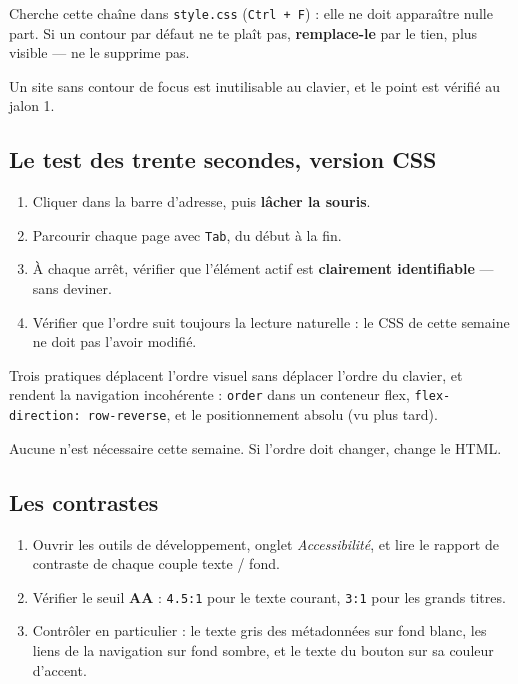 \documentclass[a4paper,11pt]{article}
\begin{document}
\begin{tcolorbox}[interdit, title={Aucun \texttt{outline: none} dans le fichier}]
Cherche cette chaîne dans \texttt{style.css} (\texttt{Ctrl + F}) : elle ne doit apparaître nulle part. Si un contour par défaut ne te plaît pas, \textbf{remplace-le} par le tien, plus visible --- ne le supprime pas.

\vspace{3pt}
Un site sans contour de focus est inutilisable au clavier, et le point est vérifié au jalon 1.
\end{tcolorbox}

\subsection{Le test des trente secondes, version CSS}

\begin{enumerate}
  \item Cliquer dans la barre d'adresse, puis \textbf{lâcher la souris}.
  \item Parcourir chaque page avec \texttt{Tab}, du début à la fin.
  \item À chaque arrêt, vérifier que l'élément actif est \textbf{clairement identifiable} --- sans deviner.
  \item Vérifier que l'ordre suit toujours la lecture naturelle : le CSS de cette semaine ne doit pas l'avoir modifié.
\end{enumerate}

\begin{tcolorbox}[attention, title={Ce que le CSS peut casser}]
Trois pratiques déplacent l'ordre visuel sans déplacer l'ordre du clavier, et rendent la navigation incohérente : \texttt{order} dans un conteneur flex, \texttt{flex-direction: row-reverse}, et le positionnement absolu (vu plus tard).

\vspace{3pt}
Aucune n'est nécessaire cette semaine. Si l'ordre doit changer, change le HTML.
\end{tcolorbox}

\subsection{Les contrastes}

\begin{enumerate}
  \item Ouvrir les outils de développement, onglet \textit{Accessibilité}, et lire le rapport de contraste de chaque couple texte / fond.
  \item Vérifier le seuil \textbf{AA} : \texttt{4.5:1} pour le texte courant, \texttt{3:1} pour les grands titres.
  \item Contrôler en particulier : le texte gris des métadonnées sur fond blanc, les liens de la navigation sur fond sombre, et le texte du bouton sur sa couleur d'accent.
\end{enumerate}
\end{document}
